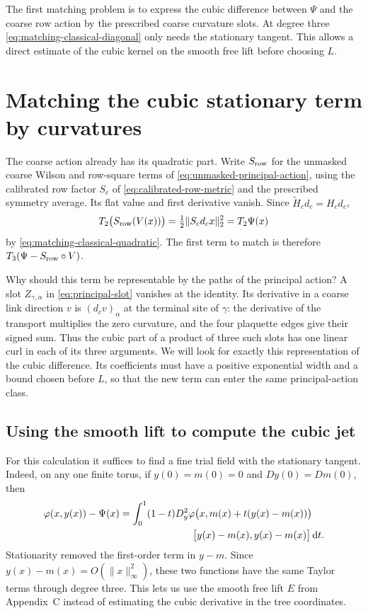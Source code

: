 \documentclass[11pt,reqno]{amsart}
\numberwithin{equation}{section}
\theoremstyle{definition}
\theoremstyle{remark}
\newcommand{\dd}{\mathrm d}
\begin{document}
The first matching problem is to express the cubic
difference between \(\Psi\) and the coarse row action
by the prescribed coarse curvature slots. At degree
three \eqref{eq:matching-classical-diagonal} only needs
the stationary tangent. This allows a direct estimate
of the cubic kernel on the smooth free lift before
choosing \(L\).

\section{Matching the cubic stationary term by curvatures}
\label{sec:cubic-curvature-matching}

The coarse action already has its quadratic part. Write
\(S_{\rm row}\) for the unmasked coarse Wilson and row-square
terms of \eqref{eq:unmasked-principal-action}, using the
calibrated row factor \(S_c\) of \eqref{eq:calibrated-row-metric}
and the prescribed symmetry average. Its flat value and first
derivative vanish. Since \(\widetilde H_cd_c=H_cd_c\),
\[
 T_2\bigl(S_{\rm row}(V(x))\bigr)
 =\tfrac12\|S_cd_cx\|_2^2
 =T_2\Psi(x)
\]
by \eqref{eq:matching-classical-quadratic}. The first term
to match is therefore \(T_3(\Psi-S_{\rm row}\circ V)\).

Why should this term be representable by the paths of the
principal action? A slot \(Z_{\gamma,\alpha}\) in
\eqref{eq:principal-slot} vanishes at the identity. Its
derivative in a coarse link direction \(v\) is
\((d_cv)_\alpha\) at the terminal site of \(\gamma\):
the derivative of the transport multiplies the zero
curvature, and the four plaquette edges give their signed
sum. Thus the cubic part of a product of three such slots
has one linear curl in each of its three arguments. We will
look for exactly this representation of the cubic
difference. Its coefficients must have a positive
exponential width and a bound chosen before \(L\), so that
the new term can enter the same principal-action class.

\subsection{Using the smooth lift to compute the cubic jet}

For this calculation it suffices to find a fine trial field
with the stationary tangent. Indeed, on any one finite
torus, if \(y(0)=m(0)=0\) and \(Dy(0)=Dm(0)\), then
\[
 \begin{split}
 \varphi(x,y(x))-\Psi(x)
   &=\int_0^1(1-t)D_y^2\varphi\bigl(x,m(x)+t(y(x)-m(x))\bigr)\\
   &\hspace{26mm}\bigl[y(x)-m(x),y(x)-m(x)\bigr]\,\dd t.
 \end{split}
\]
Stationarity removed the first-order term in \(y-m\).
Since \(y(x)-m(x)=O(\|x\|_\infty^2)\), these two functions
have the same Taylor terms through degree three. This lets
us use the smooth free lift \(E\) from Appendix~C instead
of estimating the cubic derivative in the tree coordinates.
\end{document}
